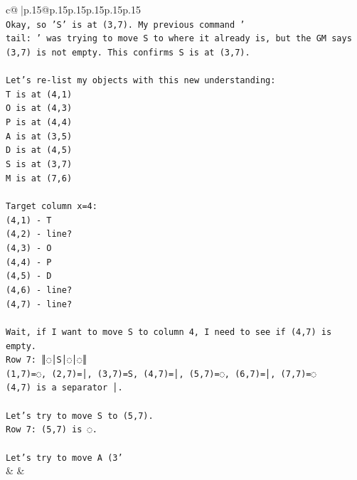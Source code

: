 \documentclass{article}
\begin{document}
{\begin{supertabular}{c@{$\;$}|p{.15\linewidth}@{}p{.15\linewidth}p{.15\linewidth}p{.15\linewidth}p{.15\linewidth}p{.15\linewidth}}
{{{\\ 
\texttt{Okay, so 'S' is at (3,7). My previous command '} \\
\texttt{tail: ' was trying to move S to where it already is, but the GM says (3,7) is not empty. This confirms S is at (3,7).} \\
\\ 
\texttt{Let's re{-}list my objects with this new understanding:} \\
\texttt{T is at (4,1)} \\
\texttt{O is at (4,3)} \\
\texttt{P is at (4,4)} \\
\texttt{A is at (3,5)} \\
\texttt{D is at (4,5)} \\
\texttt{S is at (3,7)} \\
\texttt{M is at (7,6)} \\
\\ 
\texttt{Target column x=4:} \\
\texttt{(4,1) {-} T} \\
\texttt{(4,2) {-} line?} \\
\texttt{(4,3) {-} O} \\
\texttt{(4,4) {-} P} \\
\texttt{(4,5) {-} D} \\
\texttt{(4,6) {-} line?} \\
\texttt{(4,7) {-} line?} \\
\\ 
\texttt{Wait, if I want to move S to column 4, I need to see if (4,7) is empty.} \\
\texttt{Row 7: ║◌│S│◌│◌║} \\
\texttt{(1,7)=◌, (2,7)=│, (3,7)=S, (4,7)=│, (5,7)=◌, (6,7)=│, (7,7)=◌} \\
\texttt{(4,7) is a separator │.} \\
\\ 
\texttt{Let's try to move S to (5,7).} \\
\texttt{Row 7: (5,7) is ◌.} \\
\\ 
\texttt{Let's try to move A (3'} \\
            }
        }
    }
    & & \\ \\


\end{supertabular}}
\end{document}
